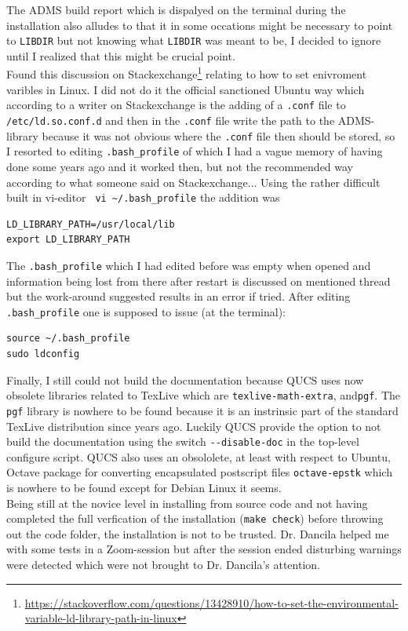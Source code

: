 \documentclass{article}
\begin{document}
\begin{multicols}{2}
The ADMS build report which is dispalyed on the terminal during the installation also alludes to that
it in some occations might be necessary to point to \verb+LIBDIR+ but not knowing what \verb+LIBDIR+ was meant to be, I decided to ignore
until I realized that this might be crucial point.\\
Found this discussion on Stackexchange\footnote{\url{https://stackoverflow.com/questions/13428910/how-to-set-the-environmental-variable-ld-library-path-in-linux}}
relating to how to set enivroment varibles in Linux.
I did not do it the official sanctioned Ubuntu way which according to a writer on Stackexchange is the adding of
a \verb+.conf+ file to
\verb+/etc/ld.so.conf.d+ and then in the \verb+.conf+ file write the path to the ADMS-library because it was
not obvious where the  \verb+.conf+ file then should be stored, so I resorted to editing \verb+.bash_profile+
of which I had a vague memory of having done some years ago and it worked then, but not the recommended way according to what someone said on Stackexchange...
Using the rather difficult built in vi-editor \verb+ vi ~/.bash_profile+ the addition was
\begin{verbatim}
LD_LIBRARY_PATH=/usr/local/lib
export LD_LIBRARY_PATH
\end{verbatim}
The \verb+.bash_profile+ which I had edited before was empty when opened and information being lost from there after restart is discussed on mentioned thread
but the work-around suggested results in an error if tried. After editing \verb+.bash_profile+ one is supposed to issue (at the terminal):
\begin{verbatim}
source ~/.bash_profile
sudo ldconfig
\end{verbatim}
Finally, I still could not build the documentation because QUCS uses now obsolete libraries related to TexLive which are
\verb+texlive-math-extra+, and\verb+pgf+. The \verb+pgf+ library is nowhere to be found because it is an instrinsic part of the standard TexLive distribution since years ago.
Luckily QUCS provide the option to not build the documentation using the switch \verb+--disable-doc+ in the top-level configure script.
QUCS also uses an obsololete, at least with respect to Ubuntu, Octave package for converting encapsulated postscript files
\verb+octave-epstk+ which is nowhere to be found except for Debian Linux it seems.\\

Being still at the novice level in installing from source code and not having completed the full verfication of the installation
(\verb+make check+) before throwing out the code folder, the installation is not to be trusted.
 Dr. Dancila helped me with some tests in a Zoom-session
but after the session ended disturbing warnings were detected which were not brought to Dr. Dancila's attention.

\end{multicols}
\end{document}
